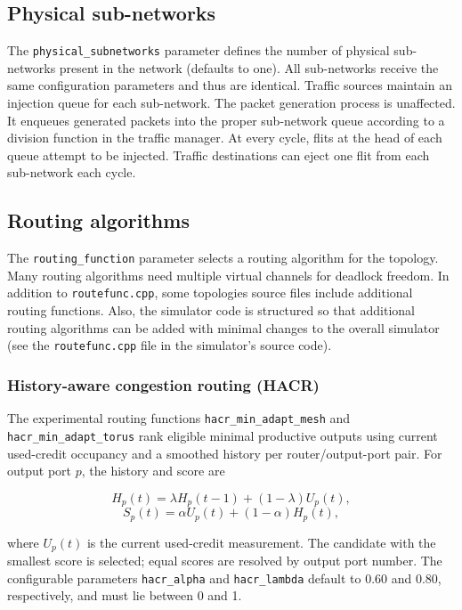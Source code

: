 \documentclass[11pt]{article}
\begin{document}
\subsection{Physical sub-networks}
\label{sec:physical_subnets}

The \texttt{physical\_subnetworks} parameter defines the number of
physical sub-networks present in the network (defaults to one). All
sub-networks receive the same configuration parameters and thus are
identical. Traffic sources maintain an injection queue for each
sub-network. The packet 
generation process is unaffected. It enqueues generated packets into
the proper sub-network queue according to a division function in the
traffic manager. At every cycle, flits at the head of each queue
attempt to be injected. Traffic destinations can eject one flit from
each sub-network each cycle. 


\subsection{Routing algorithms}
\label{sec:routing_algs}

The \texttt{routing\_function} parameter selects a routing algorithm
for the topology.  Many routing algorithms need multiple virtual
channels for deadlock freedom. In addition to \texttt{routefunc.cpp},
some topologies source files include additional routing
functions. Also, the simulator code is structured so that additional
routing algorithms can be added with minimal changes to the overall
simulator (see the \texttt{routefunc.cpp} file in the simulator's
source code). 

\subsubsection{History-aware congestion routing (HACR)}

The experimental routing functions \texttt{hacr\_min\_adapt\_mesh} and
\texttt{hacr\_min\_adapt\_torus} rank eligible minimal productive
outputs using current used-credit occupancy and a smoothed history per
router/output-port pair. For output port $p$, the history and score are

\[
H_p(t) = \lambda H_p(t-1) + (1-\lambda)U_p(t),
\]
\[
S_p(t) = \alpha U_p(t) + (1-\alpha)H_p(t),
\]

where $U_p(t)$ is the current used-credit measurement. The candidate
with the smallest score is selected; equal scores are resolved by output
port number. The configurable parameters \texttt{hacr\_alpha} and
\texttt{hacr\_lambda} default to 0.60 and 0.80, respectively, and must
lie between 0 and 1.
\end{document}
